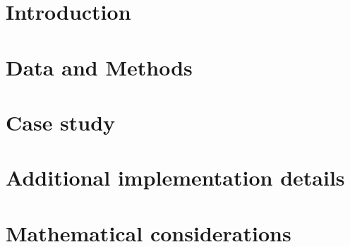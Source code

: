 \documentclass[a4paper,11pt,twoside,openany,british]{book}
\begin{document}
\frontmatter

\tableofcontents

\mainmatter
\chapter{Introduction}
\label{sec:Introduction}

\chapter{Data and Methods}
\label{sec:Methods}


\chapter{Case study}
\label{sec:Case study}


\appendix
\chapter{Additional implementation details}

\chapter{Mathematical considerations}


\backmatter
\printbibliography[heading=bibintoc]
\printnoidxglossary[type=definitions]
\printnoidxglossary[type=\acronymtype,nonumberlist]
\printnoidxglossary[type=symbols,nonumberlist]
\glsaddallunused[symbols]
\end{document}
